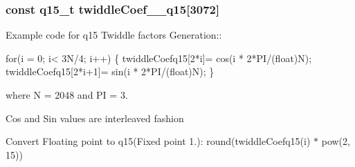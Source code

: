 \subsubsection[{\texorpdfstring{twiddle\+Coef\+\_\+2048\+\_\+q15}{twiddleCoef_2048_q15}}]{\setlength{\rightskip}{0pt plus 5cm}const q15\+\_\+t twiddle\+Coef\+\_\+\_\+q15\mbox{[}3072\mbox{]}}\hypertarget{group__CFFT__CIFFT_gadd16ce08ffd1048c385e0534a3b19cbb}{}\label{group__CFFT__CIFFT_gadd16ce08ffd1048c385e0534a3b19cbb}
\begin{DoxyParagraph}{}
Example code for q15 Twiddle factors Generation\+:\+: 
\end{DoxyParagraph}
\begin{DoxyParagraph}{}

\begin{DoxyPre}for(i = 0; i< 3N/4; i++)
\{
   twiddleCoefq15[2*i]= cos(i * 2*PI/(float)N);
   twiddleCoefq15[2*i+1]= sin(i * 2*PI/(float)N);
\} \end{DoxyPre}
 
\end{DoxyParagraph}
\begin{DoxyParagraph}{}
where N = 2048 and PI = 3. 
\end{DoxyParagraph}
\begin{DoxyParagraph}{}
Cos and Sin values are interleaved fashion 
\end{DoxyParagraph}
\begin{DoxyParagraph}{}
Convert Floating point to q15(Fixed point 1.)\+: round(twiddle\+Coefq15(i) $\ast$ pow(2, 15)) 
\end{DoxyParagraph}
